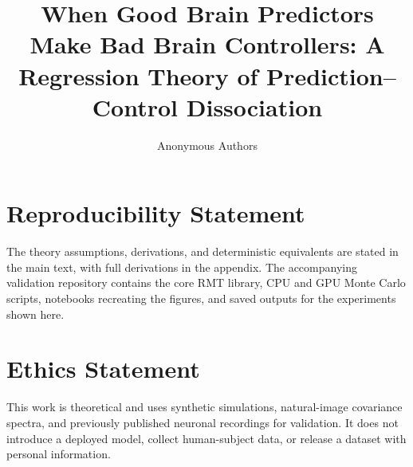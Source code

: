 \documentclass{article}
\title{When Good Brain Predictors Make Bad Brain Controllers: A Regression Theory of Prediction–Control Dissociation}
\author{Anonymous Authors}
\theoremstyle{plain}
\theoremstyle{definition}
\theoremstyle{remark}
\begin{document}
\maketitle
% 

\clearpage
\section{Reproducibility Statement}
The theory assumptions, derivations, and deterministic equivalents are stated in the main text, with full derivations in the appendix. The accompanying validation repository contains the core RMT library, CPU and GPU Monte Carlo scripts, notebooks recreating the figures, and saved outputs for the experiments shown here.

\section{Ethics Statement}
This work is theoretical and uses synthetic simulations, natural-image covariance spectra, and previously published neuronal recordings for validation. It does not introduce a deployed model, collect human-subject data, or release a dataset with personal information.




\clearpage
\appendix
\tableofcontents{}
% 



\end{document}
